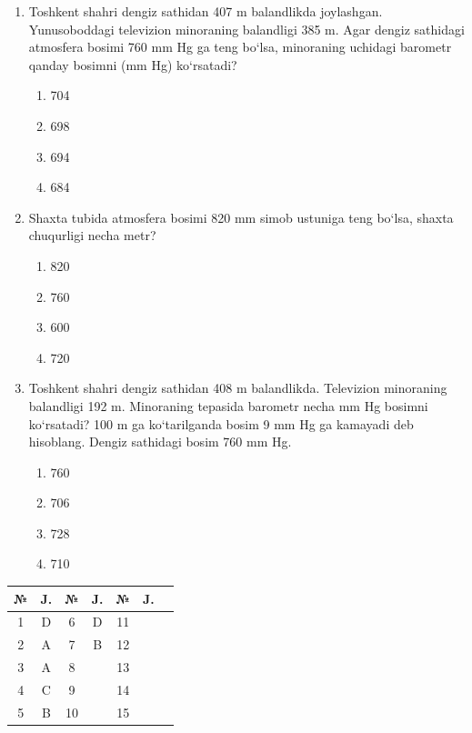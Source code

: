 \begin{enumerate}
\begin{enumerate}[label=\Alph*)]
\item $\rho_4>\rho_3>\rho_2>\rho_1$
\item $\rho_4>\rho_1>\rho_2>\rho_3$
\item $\rho_1=\rho_4>\rho_2=\rho_3$
\item $\rho_2>\rho_3,\ \rho_1>\rho_4$
\end{enumerate}


\item Toshkent shahri dengiz sathidan 407 m balandlikda joylashgan. 
Yunusoboddagi televizion minoraning balandligi 385 m. 
Agar dengiz sathidagi atmosfera bosimi 760 mm Hg ga teng bo‘lsa, 
minoraning uchidagi barometr qanday bosimni (mm Hg) ko‘rsatadi?

\begin{enumerate}[label=\Alph*)]
\item 704
\item 698
\item 694
\item 684

\end{enumerate}


\item Shaxta tubida atmosfera bosimi 820 mm simob ustuniga teng bo‘lsa, 
shaxta chuqurligi necha metr?

\begin{enumerate}[label=\Alph*)]
\item 820
\item 760
\item 600
\item 720
\end{enumerate}


\item Toshkent shahri dengiz sathidan 408 m balandlikda. 
Televizion minoraning balandligi 192 m. 
Minoraning tepasida barometr necha mm Hg bosimni ko‘rsatadi? 
100 m ga ko‘tarilganda bosim 9 mm Hg ga kamayadi deb hisoblang. 
Dengiz sathidagi bosim 760 mm Hg.

\begin{enumerate}[label=\Alph*)]
\item 760
\item 706
\item 728
\item 710

\end{enumerate}

\end{enumerate}



\begin{table}[h!]
\centering
\begin{tabular}{|c|c|c|c|c|c|c|}
\hline
№ & J. & № & J. & № & J.  \\ \hline
1 & D & 6 & D & 11 &  \\ \hline
2 & A & 7 & B & 12 &  \\ \hline
3 & A & 8 &  & 13 &  \\ \hline
4 & C & 9 &  & 14 &   \\ \hline
5 & B & 10 &  & 15 &   \\ \hline
\end{tabular}
\end{table}